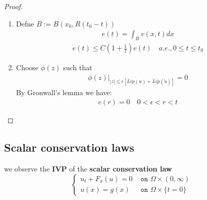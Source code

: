 \documentclass[a4paper,11pt,oneside,fleqn]{book}
\theoremstyle{definition}
\theoremstyle{remark}
\begin{document}
\begin{proof}
\begin{enumerate}
	\item Defne $B:= B(x_0, R(t_0 - t))$
	\begin{align*}
		e(t) = \int_B v(x, t) dx 
	\end{align*}
	\begin{align*}
		\dot{e}(t) \le C (1 + \frac{1}{t})e(t) \quad a.e. , 0 \le t \le t_0
	\end{align*}
	\item Choose $\phi(z)$ such that 
	\begin{align*}
		\phi(z) |_{|z| \le \epsilon [Lip(u) + Lip(\tilde{u})]} = 0
	\end{align*} 
	By Gronwall's lemma we have:
	\begin{align*}
		e(r) = 0 \quad 0< \epsilon < r < t
	\end{align*}
\end{enumerate}
\end{proof}

\subsection{Scalar conservation laws}
we observe the \textbf{IVP} of the \textbf{scalar conservation law}
\begin{equation*}
\left\{
\begin{aligned}
	u_t + F_x(u) = 0 &\texttt{ on } \Omega \times (0, \infty) \\
	u(x) = g(x) &\texttt{ on } \Omega \times \{t = 0\}
\end{aligned}
\right.
\end{equation*}
\end{document}
